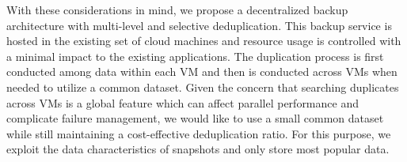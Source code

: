 \begin{enumerate}
\end{enumerate}


%


With these considerations in mind, we propose a decentralized backup architecture with multi-level and selective 
deduplication. This 
backup service is hosted   in the existing set of cloud machines and resource usage is controlled
with a minimal impact to the existing applications.
The duplication process is first conducted among data within each VM
and then is conducted  across VMs when needed to 
utilize a common dataset.  
Given the concern that searching duplicates across  VMs  is a global feature which can affect parallel performance
and complicate failure management,
we would like to use a small common dataset while still maintaining a cost-effective deduplication ratio.
For this purpose, we exploit the data characteristics of snapshots and only store most popular data.
%


